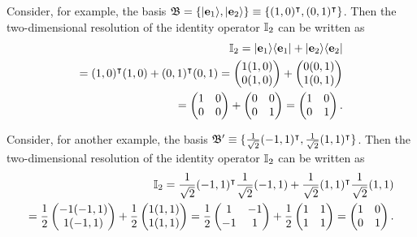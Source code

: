{\color{blue}
\bexample
Consider, for example, the basis
${\frak B}=\{ \vert {\bf e}_1 \rangle , \vert {\bf e}_2 \rangle \} \equiv \{(1,0)^\intercal ,(0,1)^\intercal \}$.
Then the two-dimensional resolution of the identity operator ${\Bbb I}_2$
can be written as
\begin{equation}
\begin{split}
{\Bbb I}_2 =   \vert {\bf e}_1 \rangle \langle  {\bf e}_1 \vert   +     \vert {\bf e}_2 \rangle  \langle  {\bf e}_2 \vert \\
=   (1,0)^\intercal  (1,0) +   (0,1)^\intercal  (0,1)
=
\begin{pmatrix}
1 (1,0) \\  0 (1,0)
\end{pmatrix}
 +
\begin{pmatrix}
0 (0,1)\\
1 (0,1)
\end{pmatrix} \\
 =
\begin{pmatrix}
1 & 0 \\
0 & 0
\end{pmatrix}
+
\begin{pmatrix}
0 & 0 \\
0 & 1
\end{pmatrix}
=
\begin{pmatrix}
1 & 0 \\
0 & 1
\end{pmatrix}
.
\end{split}
\end{equation}

Consider, for another example, the basis
${\frak B}' \equiv \{\frac{1}{\sqrt{2}}(-1,1)^\intercal ,\frac{1}{\sqrt{2}}(1,1)^\intercal \}$.
Then the two-dimensional resolution of the identity operator ${\Bbb I}_2$
can be written as
\begin{equation}
\begin{split}
{\Bbb I}_2 =  \frac{1}{\sqrt{2}}   (-1,1)^\intercal   \frac{1}{\sqrt{2}}(-1,1) +   \frac{1}{\sqrt{2}}(1,1)^\intercal  \frac{1}{\sqrt{2}}(1,1)
\\
=
\frac{1}{{2}}
\begin{pmatrix}
-1 (-1,1) \\  1 (-1,1)
\end{pmatrix}
 +
\frac{1}{{2}}
\begin{pmatrix}
1 (1,1)\\
1 (1,1)
\end{pmatrix}
 =
\frac{1}{{2}}
\begin{pmatrix}
1 & -1 \\
-1 & 1
\end{pmatrix}
+
\frac{1}{{2}}
\begin{pmatrix}
1 & 1 \\
1 & 1
\end{pmatrix}
=
\begin{pmatrix}
1 & 0 \\
0 & 1
\end{pmatrix}
.
\end{split}
\end{equation}


\eexample
}


